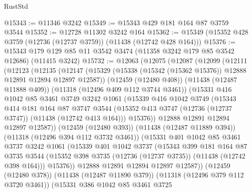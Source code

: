 \begin{lexlean}{RustStd}
\begin{coremodule}
@15343 := @11346 @3242
@15349 := @15343 @429 @181 @164 @87 @3759 @3544
@15352 := @12728 @11302 @3242 @164
@15362 := @15349 (@15352 @428 @3759 (@12736 (@12737 @3759)) (@11438 (@12742 @428 @164)))
@15376 := @15343 @179 @129 @85 @11 @3542 @3474 (@11358 @3242 @179 @85 @3542 @12686) (@11415 @3242)
@15732 := @12063
    (@12075
      (@12087
        (@12099
          (@12111
            (@12123
              (@12135
                (@12147
                  (@15329 (@15338 (@15342 (@15362 @15376)) @12888 @12891 @12894 @12897 @12587))
                  (@12459 (@12480 @408))
                  (@11438 (@12487 @11888 @409))
                  (@11318 (@12496 @409 @112 @3744 @3461))
                  (@15331
                    @416
                    @1042
                    @85
                    @3461
                    @3749
                    @3242
                    @1061
                    (@15339
                      @416
                      @1042
                      @3749
                      (@15343
                        @414
                        @181
                        @164
                        @87
                        @3747
                        @3544
                        (@15352 @413 @3747 (@12736 (@12737 @3747)) (@11438 (@12742 @413 @164)))
                        @15376))
                    @12888
                    @12891
                    @12894
                    @12897
                    @12587))
                (@12459 (@12480 @393))
                (@11438 (@12487 @11889 @394))
                (@11318 (@12496 @394 @112 @3732 @3461))
                (@15331
                  @401
                  @1042
                  @85
                  @3461
                  @3737
                  @3242
                  @1061
                  (@15339
                    @401
                    @1042
                    @3737
                    (@15343
                      @399
                      @181
                      @164
                      @87
                      @3735
                      @3544
                      (@15352 @398 @3735 (@12736 (@12737 @3735)) (@11438 (@12742 @398 @164)))
                      @15376))
                  @12888
                  @12891
                  @12894
                  @12897
                  @12587))
              (@12459 (@12480 @378))
              (@11438 (@12487 @11890 @379))
              (@11318 (@12496 @379 @112 @3720 @3461))
              (@15331
                @386
                @1042
                @85
                @3461
                @3725

\end{coremodule}
\end{lexlean}
